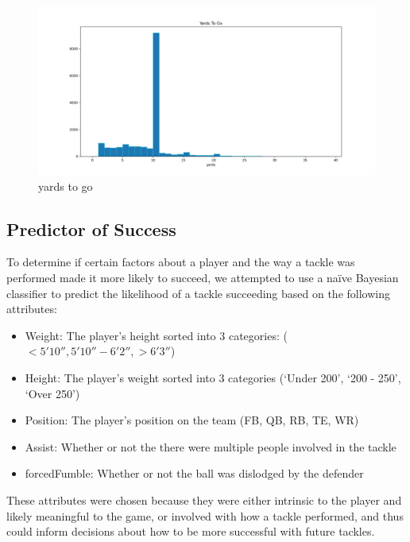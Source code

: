 \documentclass[bibtex, sigconf, hyperref={colorlinks=true,linkcolor=blue,urlcolor=blue}]{acmart}
\begin{document}
\begin{figure}[h]
  \centering
  \includegraphics[width=\linewidth]{../src/yards.png}
  \caption{yards to go}
\end{figure}

\subsection{Predictor of Success}

To determine if certain factors about a player and the way a tackle was
performed made it more likely to succeed, we attempted to use a na\"ive Bayesian
classifier to predict the likelihood of a tackle succeeding based on the
following attributes:

\begin{itemize}
\item Weight: The player's height sorted into 3 categories: ($< 5'10'',
5'10''-6'2'', > 6'3''$)
\item Height: The player's weight sorted into 3 categories (`Under 200', `200 -
250', `Over 250')
\item Position: The player's position on the team (FB, QB, RB, TE, WR)
\item Assist: Whether or not the there were multiple people involved in the
tackle
\item forcedFumble: Whether or not the ball was dislodged by the defender
\end{itemize}

These attributes were chosen because they were either intrinsic to the player
and likely meaningful to the game, or involved with how a tackle performed, and
thus could inform decisions about how to be more successful with future tackles.
\end{document}
